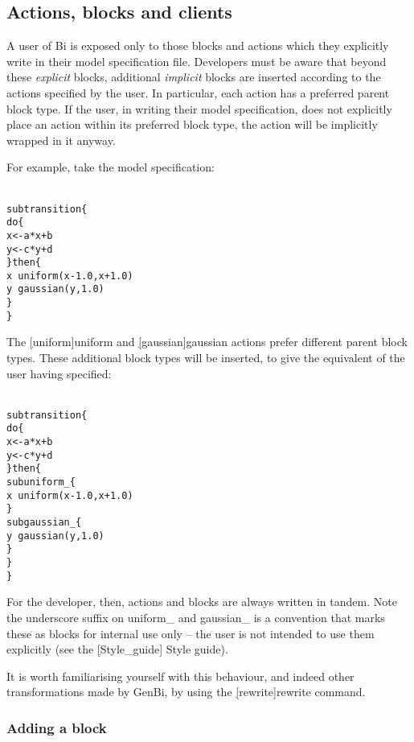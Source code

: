 \subsection{Actions, blocks and clients}

A user of Bi is exposed only to those blocks and actions which they explicitly
write in their model specification file. Developers must be aware that beyond
these \textit{explicit} blocks, additional \textit{implicit} blocks are
inserted according to the actions specified by the user. In particular, each
action has a preferred parent block type. If the user, in writing their model
specification, does not explicitly place an action within its
preferred block type, the action will be implicitly wrapped in it anyway.

For example, take the model specification:
\begin{alltt}{\sf
    sub transition \{
      do \{
        x <- a*x + b
        y <- c*y + d
      \} then \{
        x ~ uniform(x - 1.0, x + 1.0)
        y ~ gaussian(y, 1.0)
      \}
    \}
}\end{alltt}
The \hyperref[hyper][uniform]{\sf uniform} and
\hyperref[hyper][gaussian]{\sf gaussian} actions prefer
different parent block types. These additional block types will be inserted,
to give the equivalent of the user having specified:
\begin{alltt}{\sf
    sub transition \{
      do \{
        x <- a*x + b
        y <- c*y + d
      \} then \{
        sub uniform_ \{
          x ~ uniform(x - 1.0, x + 1.0)
        \}
        sub gaussian_ \{
          y ~ gaussian(y, 1.0)
        \}
      \}  
    \}
}\end{alltt}

For the developer, then, actions and blocks are always written in tandem.
Note the underscore suffix on \textsf{uniform\_} and \textsf{gaussian\_} is a
convention that marks these as blocks for internal use only -- the user is not
intended to use them explicitly (see the \hyperref[hyper][Style_guide]{\sf
  Style guide}).

It is worth familiarising yourself with this behaviour, and indeed other
transformations made by GenBi, by using the
\hyperref[hyper][rewrite]{\sf rewrite} command.

\subsubsection{Adding a block}


